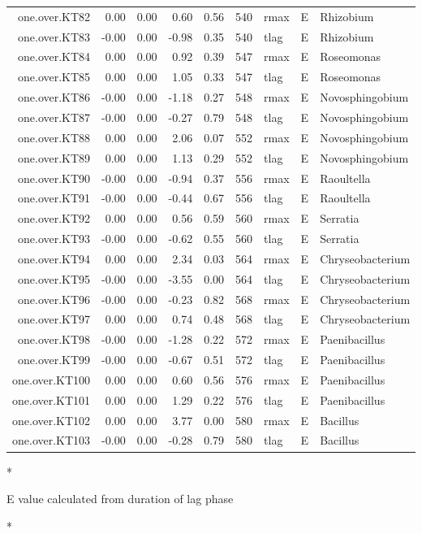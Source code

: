 \begin{table}[ht]
\begin{tabular}{rrrrrrlll}
  one.over.KT82 & 0.00 & 0.00 & 0.60 & 0.56 & 540 & rmax & E & Rhizobium \\ 
  one.over.KT83 & -0.00 & 0.00 & -0.98 & 0.35 & 540 & tlag & E & Rhizobium \\ 
  one.over.KT84 & 0.00 & 0.00 & 0.92 & 0.39 & 547 & rmax & E & Roseomonas \\ 
  one.over.KT85 & 0.00 & 0.00 & 1.05 & 0.33 & 547 & tlag & E & Roseomonas \\ 
  one.over.KT86 & -0.00 & 0.00 & -1.18 & 0.27 & 548 & rmax & E & Novosphingobium \\ 
  one.over.KT87 & -0.00 & 0.00 & -0.27 & 0.79 & 548 & tlag & E & Novosphingobium \\ 
  one.over.KT88 & 0.00 & 0.00 & 2.06 & 0.07 & 552 & rmax & E & Novosphingobium \\ 
  one.over.KT89 & 0.00 & 0.00 & 1.13 & 0.29 & 552 & tlag & E & Novosphingobium \\ 
  one.over.KT90 & -0.00 & 0.00 & -0.94 & 0.37 & 556 & rmax & E & Raoultella \\ 
  one.over.KT91 & -0.00 & 0.00 & -0.44 & 0.67 & 556 & tlag & E & Raoultella \\ 
  one.over.KT92 & 0.00 & 0.00 & 0.56 & 0.59 & 560 & rmax & E & Serratia \\ 
  one.over.KT93 & -0.00 & 0.00 & -0.62 & 0.55 & 560 & tlag & E & Serratia \\ 
  one.over.KT94 & 0.00 & 0.00 & 2.34 & 0.03 & 564 & rmax & E & Chryseobacterium \\ 
  one.over.KT95 & -0.00 & 0.00 & -3.55 & 0.00 & 564 & tlag & E & Chryseobacterium \\ 
  one.over.KT96 & -0.00 & 0.00 & -0.23 & 0.82 & 568 & rmax & E & Chryseobacterium \\ 
  one.over.KT97 & 0.00 & 0.00 & 0.74 & 0.48 & 568 & tlag & E & Chryseobacterium \\ 
  one.over.KT98 & -0.00 & 0.00 & -1.28 & 0.22 & 572 & rmax & E & Paenibacillus \\ 
  one.over.KT99 & -0.00 & 0.00 & -0.67 & 0.51 & 572 & tlag & E & Paenibacillus \\ 
  one.over.KT100 & 0.00 & 0.00 & 0.60 & 0.56 & 576 & rmax & E & Paenibacillus \\ 
  one.over.KT101 & 0.00 & 0.00 & 1.29 & 0.22 & 576 & tlag & E & Paenibacillus \\ 
  one.over.KT102 & 0.00 & 0.00 & 3.77 & 0.00 & 580 & rmax & E & Bacillus \\ 
  one.over.KT103 & -0.00 & 0.00 & -0.28 & 0.79 & 580 & tlag & E & Bacillus \\ 
   \hline
\end{tabular}
\end{table}


\/*
\caption{E value calculated from duration of lag phase}
\label{table:thereflable}
\/*